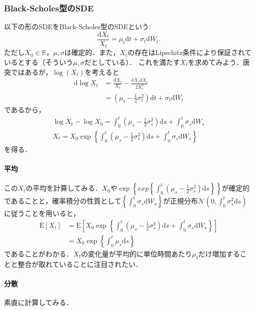 \documentclass{jsarticle}
\theoremstyle{definition}
\begin{document}
\subsubsection{Black-Scholes型のSDE}
以下の形のSDEをBlack-Scholes型のSDEという:
\begin{equation*}
    \frac{\mathrm{d}X_t}{X_t} = \mu_t \mathrm{d}t + \sigma_t\mathrm{d}W_t.
\end{equation*}
ただし$X_0 \in \mathbb{R}$，$\mu, \sigma$は確定的．また，$X_t$の存在はLipschitz条件により保証されているとする（そういう$\mu, \sigma$だとしている）．
これを満たす$X_t$を求めてみよう．唐突ではあるが，$\log(X_t)$を考えると
\begin{align*}
    \mathrm{d}\log X_t &= \frac{\mathrm{d}X_t}{X_t} - \frac{\mathrm{d}X_t\mathrm{d}X_t}{2X_t^2}\\
    &= (\mu_t - \frac{1}{2}\sigma_t^2)\mathrm{d}t + \sigma_t\mathrm{d}W_t
\end{align*}
であるから，
\begin{gather*}
    \log{X_t} - \log{X_0} = \int_0^t(\mu_s - \frac{1}{2}\sigma_s^2)\mathrm{d}s + \int_0^t\sigma_s\mathrm{d}W_s\\
    X_t = X_0 \exp{\left\{\int_0^t(\mu_s - \frac{1}{2}\sigma_s^2)\mathrm{d}s + \int_0^t\sigma_s\mathrm{d}W_s\right\}}
\end{gather*}
を得る．

\paragraph{平均}
この$X_t$の平均を計算してみる．$X_0$や$\exp{\left\{exp{\left\{\int_0^t(\mu_s - \frac{1}{2}\sigma_s^2)\mathrm{d}s\right\}}\right\}}$が確定的であることと，確率積分の性質として$\left\{\int_0^t\sigma_s\mathrm{d}W_s\right\}$が正規分布$\mathcal{N}(0, \int_0^t \sigma^2_s \mathrm{d}s)$に従うことを用いると，
\begin{align*}
    \mathrm{E}\left[X_t\right] &= \mathrm{E}\left[X_0 \exp{\left\{\int_0^t(\mu_s - \frac{1}{2}\sigma_s^2)\mathrm{d}s + \int_0^t\sigma_s\mathrm{d}W_s\right\}}\right]\\
    &= X_0 \exp{\left\{\int_0^t \mu_s \mathrm{d}s\right\}}
\end{align*}
であることがわかる．$X_t$の変化量が平均的に単位時間あたり$\mu_t$だけ増加することと整合が取れていることに注目されたい．

\paragraph{分散}
素直に計算してみる．
\end{document}
